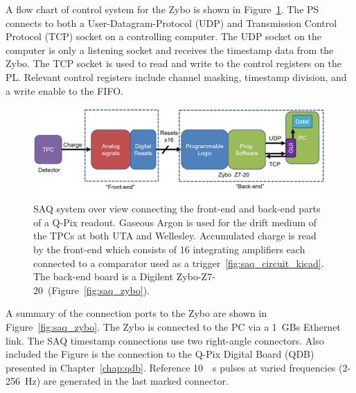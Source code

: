 A flow chart of control system for the Zybo is shown in Figure~\ref{fig:saq_diagram}.
The PS connects to both a User-Datagram-Protocol (UDP) and Transmission Control Protocol (TCP) socket on a controlling computer.
The UDP socket on the computer is only a listening socket and receives the timestamp data from the Zybo.
The TCP socket is used to read and write to the control registers on the PL.
Relevant control registers include channel masking, timestamp division, and a write enable to the FIFO.

\begin{figure}[]
\centering
\includegraphics[width=\textwidth]{images/saq_daq_back-end_summary.png}
\caption{SAQ system over view connecting the front-end and back-end parts of a Q-Pix readout.
Gaseous Argon is used for the drift medium of the TPCs at both UTA and Wellesley.
Accumulated charge is read by the front-end which consists of 16 integrating amplifiers each connected to a comparator used as a trigger~\ref{fig:saq_circuit_kicad}.
The back-end board is a Digilent Zybo-Z7-20~(Figure~\ref{fig:saq_zybo}).
}
\label{fig:saq_diagram}
\end{figure}

A summary of the connection ports to the Zybo are shown in Figure~\ref{fig:saq_zybo}.
The Zybo is connected to the PC via a 1~\unit{GBs} Ethernet link.
The SAQ timestamp connections use two right-angle connectors.
Also included the Figure is the connection to the Q-Pix Digital Board (QDB) presented in Chapter~\ref{chap:qdb}.
Reference 10~\unit{\mu s} pulses at varied frequencies (2-256~\unit{Hz}) are generated in the last marked connector.

